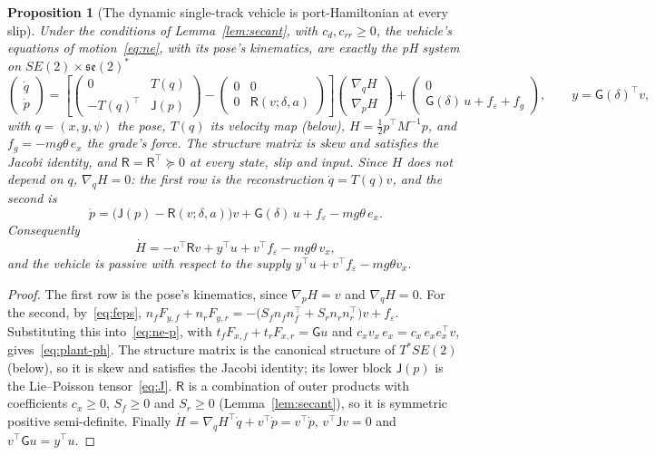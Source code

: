 \documentclass[11pt]{article}
\newtheorem{proposition}{Proposition}
\theoremstyle{remark}
\newcommand{\J}{\mathsf J}
\newcommand{\R}{\mathsf R}
\newcommand{\G}{\mathsf G}
\newcommand{\T}{^{\top}}
\newcommand{\se}{\mathfrak{se}(2)}
\begin{document}
\begin{proposition}[The dynamic single-track vehicle is port-Hamiltonian at every slip]
\label{prop:ph}
Under the conditions of Lemma~\ref{lem:secant}, with $c_d,c_{rr}\ge0$, the vehicle's equations
of motion~\eqref{eq:ne}, with its pose's kinematics, are exactly the pH system on
$SE(2)\times\se^*$
\begin{equation}
  \begin{pmatrix}\dot q\\\dot p\end{pmatrix}=\left[\begin{pmatrix}0&T(q)\\-T(q)\T&\J(p)\end{pmatrix}
  -\begin{pmatrix}0&0\\0&\R(v;\delta,a)\end{pmatrix}\right]
  \begin{pmatrix}\nabla_qH\\\nabla_pH\end{pmatrix}
  +\begin{pmatrix}0\\\G(\delta)\,u+f_\varepsilon+f_g\end{pmatrix},\qquad y=\G(\delta)\T v,
  \label{eq:plant-full}
\end{equation}
with $q=(x,y,\psi)$ the pose, $T(q)$ its velocity map (below), $H=\tfrac12p\T M^{-1}p$, and
$f_g=-mg\theta\,e_x$ the grade's force. The structure matrix is skew and satisfies the Jacobi
identity, and $\R=\R\T\succeq0$ at every state, slip and input. Since $H$ does not depend on $q$,
$\nabla_qH=0$: the first row is the reconstruction $\dot q=T(q)v$, and the second is
\begin{equation}
  \dot p=\big(\J(p)-\R(v;\delta,a)\big)v+\G(\delta)\,u+f_\varepsilon-mg\theta\,e_x .
  \label{eq:plant-ph}
\end{equation}
Consequently
\begin{equation}
  \dot H=-v\T\R v+y\T u+v\T f_\varepsilon-mg\theta\,v_x ,
  \label{eq:balance}
\end{equation}
and the vehicle is passive with respect to the supply $y\T u+v\T f_\varepsilon-mg\theta v_x$.
\end{proposition}

\begin{proof}
The first row is the pose's kinematics, since $\nabla_pH=v$ and $\nabla_qH=0$. For the second,
by~\eqref{eq:feps}, $n_fF_{y,f}+n_rF_{y,r}=-\big(S_fn_fn_f\T+S_rn_rn_r\T\big)v+f_\varepsilon$.
Substituting this into~\eqref{eq:ne-p}, with $t_fF_{x,f}+t_rF_{x,r}=\G u$ and $c_xv_x\,e_x=c_x\,e_xe_x\T v$,
gives~\eqref{eq:plant-ph}. The structure matrix is the canonical structure of $T^*SE(2)$ (below),
so it is skew and satisfies the Jacobi identity; its lower block $\J(p)$ is the Lie--Poisson
tensor~\eqref{eq:J}. $\R$ is a combination of outer products with coefficients $c_x\ge0$,
$S_f\ge0$ and $S_r\ge0$ (Lemma~\ref{lem:secant}), so it is symmetric positive semi-definite. Finally
$\dot H=\nabla_qH\T\dot q+v\T\dot p=v\T\dot p$, $v\T\J v=0$ and $v\T\G u=y\T u$.
\end{proof}
\end{document}
